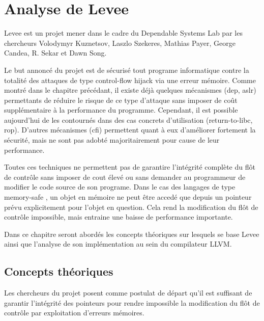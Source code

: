 \chapter{Analyse de Levee}
\label{chap:levee}


Levee est un projet mener dans le cadre du Dependable Systems Lab \cite{dslab} par les chercheurs Volodymyr Kuznetsov, Laszlo Szekeres, Mathias Payer, George Candea, R. Sekar et Dawn Song.

Le but annoncé du projet est de sécurisé tout programe informatique contre la totalité des attaques de type \og control-flow hijack \fg via une erreur mémoire. Comme montré dans le chapitre précédant, il existe déjà quelques mécanismes (\gls{dep}, \gls{aslr}) permettants de réduire le risque de ce type d'attaque sans imposer de coût supplémentaire à la performance du programme. Cependant, il est possible aujourd'hui de les contournés dans des cas concrets d'utilisation (return-to-libc, \gls{rop}). D'autres mécanismes (\gls{cfi}) permettent quant à eux d'améliorer fortement la sécurité, mais ne sont pas adobté majoritairement pour cause de leur performance.

Toutes ces techniques ne permettent pas de garantire l'intégrité complète du flôt de contrôle sans imposer de cout élevé ou sans demander au programmeur de modifier le code source de son programe. Dans le cas des langages de type \og memory-safe \fg, un objet en mémoire ne peut être accedé que depuis un pointeur prévu explicitement pour l'objet en question. Cela rend la modification du flôt de contrôle impossible, mais entraine une baisse de performance importante.

Dans ce chapitre seront abordés les concepts théoriques sur lesquels se base Levee ainsi que l'analyse de son implémentation au sein du compilateur LLVM.

\minitoc

\newpage

\section{Concepts théoriques}

Les chercheurs du projet posent comme postulat de départ qu'il est suffisant de garantir l'intégrité des pointeurs pour rendre impossible la modification du flôt de contrôle par exploitation d'erreurs mémoires.

